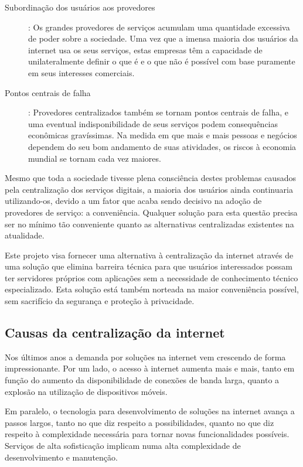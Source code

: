 \begin{anexosenv}
\begin{description}
  \item [Subordinação dos usuários aos provedores]: Os grandes provedores de 
serviços acumulam uma quantidade excessiva de poder
  sobre a sociedade. Uma vez que a imensa maioria dos usuários da internet usa
  os seus serviços, estas empresas têm a capacidade de unilateralmente definir
  o que é e o que não é possível com base puramente em seus interesses
  comerciais.
  
  \item [Pontos centrais de falha]: Provedores centralizados também se tornam 
  pontos centrais de falha, e uma
  eventual indisponibilidade de seus serviços podem consequências econômicas
  gravíssimas. Na medida em que mais e mais pessoas e negócios dependem do seu
  bom andamento de suas atividades, os riscos à economia mundial se tornam cada
  vez maiores.
\end{description}

Mesmo que toda a sociedade tivesse plena consciência destes problemas causados
pela centralização dos serviços digitais, a maioria dos usuários ainda
continuaria utilizando-os, devido a um fator que acaba sendo decisivo na adoção
de provedores de serviço: a conveniência. Qualquer solução para esta questão
precisa ser no mínimo tão conveniente quanto as alternativas centralizadas
existentes na atualidade.

Este projeto visa fornecer uma alternativa à centralização da internet através
de uma solução que elimina barreira técnica para que usuários interessados
possam ter servidores próprios com aplicações sem a necessidade de conhecimento
técnico especializado. Esta solução está também norteada na maior conveniência
possível, sem sacrifício da segurança e proteção à privacidade.

\subsection{Causas da centralização da internet}

Nos últimos anos a demanda por soluções na internet vem crescendo de forma
impressionante. Por um lado, o acesso à internet aumenta mais e mais, tanto em
função do aumento da disponibilidade de conexões de banda larga, quanto a
explosão na utilização de dispositivos móveis.

Em paralelo, o tecnologia para desenvolvimento de soluções na internet avança a
passos largos, tanto no que diz respeito a possibilidades, quanto no que diz
respeito à complexidade necessária para tornar novas funcionalidades possíveis.
Serviços de alta sofisticação implicam numa alta complexidade de
desenvolvimento e manutenção.


\end{anexosenv}
